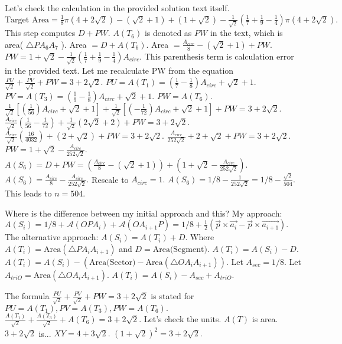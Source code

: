 Let's check the calculation in the provided solution text itself. 
$\text{Target Area} = \frac{1}{8} \pi \left(4+2\sqrt{2}\right)- \left(\sqrt{2}+1\right) + \left(1+\sqrt{2}\right)- \frac{1}{\sqrt{2}}\left(\frac{1}{7}+\frac{1}{9}-\frac{1}{4}\right)\pi\left(4+2\sqrt{2}\right).$ 
This step computes $D + PW.$ $A(T_6)$ is denoted as $PW$ in the text, which is area( $\triangle PA_6A_7$ ). 
Area $= D + A(T_6).$ 
Area $= \frac{A_{circ}}{8} - (\sqrt{2}+1) + PW.$ 
$PW = 1+\sqrt{2}- \frac{1}{\sqrt{2}}\left(\frac{1}{7}+\frac{1}{9}-\frac{1}{4}\right) A_{circ}.$ This parenthesis term is calculation error in the provided text. 
Let me recalculate PW from the equation $\frac{PU}{\sqrt{2}} + \frac{PV}{\sqrt{2}} + PW = 3+2\sqrt2.$ 
$PU = A(T_1) = (\frac{1}{7}-\frac{1}{8})A_{circ} + \sqrt{2}+1.$ 
$PV = A(T_3) = (\frac{1}{9}-\frac{1}{8})A_{circ} + \sqrt{2}+1.$ 
$PW = A(T_6).$ 
$\frac{1}{\sqrt{2}} [ (\frac{1}{56}) A_{circ} + \sqrt{2}+1 ] + \frac{1}{\sqrt{2}} [ (-\frac{1}{72}) A_{circ} + \sqrt{2}+1 ] + PW = 3+2\sqrt{2}.$ 
$\frac{A_{circ}}{\sqrt{2}} (\frac{1}{56}-\frac{1}{72}) + \frac{1}{\sqrt{2}} (2\sqrt{2}+2) + PW = 3+2\sqrt{2}.$ 
$\frac{A_{circ}}{\sqrt{2}} (\frac{16}{4032}) + (2+\sqrt{2}) + PW = 3+2\sqrt{2}.$ 
$\frac{A_{circ}}{252\sqrt{2}} + 2+\sqrt{2} + PW = 3+2\sqrt{2}.$ 
$PW = 1+\sqrt{2} - \frac{A_{circ}}{252\sqrt{2}}.$ 
$A(S_6) = D + PW = (\frac{A_{circ}}{8} - (\sqrt{2}+1)) + (1+\sqrt{2} - \frac{A_{circ}}{252\sqrt{2}}).$ 
$A(S_6) = \frac{A_{circ}}{8} - \frac{A_{circ}}{252\sqrt{2}}.$ 
Rescale to $A_{circ}=1.$ 
$A(S_6) = 1/8 - \frac{1}{252\sqrt{2}} = 1/8 - \frac{\sqrt{2}}{504}.$ 
This leads to $n=504.$

Where is the difference between my initial approach and this? 
My approach: $A(S_i) = 1/8 + \mathcal{A}(OPA_i) + \mathcal{A}(OA_{i+1}P) = 1/8 + \frac{1}{2} (\vec{p} \times \vec{a_i} - \vec{p} \times \vec{a_{i+1}}).$ 
The alternative approach: $A(S_i) = A(T_i) + D.$ Where $A(T_i) = \text{Area}(\triangle PA_iA_{i+1})$ and $D = \text{Area(Segment)}.$ 
$A(T_i) = A(S_i) - D.$ 
$A(T_i) = A(S_i) - (\text{Area(Sector)} - \text{Area}(\triangle OA_iA_{i+1})).$ 
Let $A_{sec} = 1/8.$ Let $A_{triO} = \text{Area}(\triangle OA_iA_{i+1}).$ 
$A(T_i) = A(S_i) - A_{sec} + A_{triO}.$

The formula $\frac{PU}{\sqrt{2}} + \frac{PV}{\sqrt{2}} + PW = 3+2\sqrt2$ is stated for $PU=A(T_1), PV=A(T_3), PW=A(T_6).$ 
$\frac{A(T_1)}{\sqrt{2}} + \frac{A(T_3)}{\sqrt{2}} + A(T_6) = 3+2\sqrt{2}.$ Let's check the units. $A(T)$ is area. $3+2\sqrt{2}$ is... $XY = 4+3\sqrt{2}.$ $(1+\sqrt{2})^2 = 3+2\sqrt{2}.$

